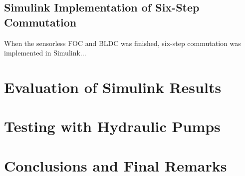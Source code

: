 \documentclass{LTHthesis}
\begin{document}
\section{Simulink Implementation of Six-Step Commutation}
When the sensorless FOC and BLDC was finished, six-step commutation was implemented in Simulink...

\chapter{Evaluation of Simulink Results}

\chapter{Testing with Hydraulic Pumps}


\chapter{Conclusions and Final Remarks}


\cite{pyr2009} %



\printbibliography  %
\end{document}
